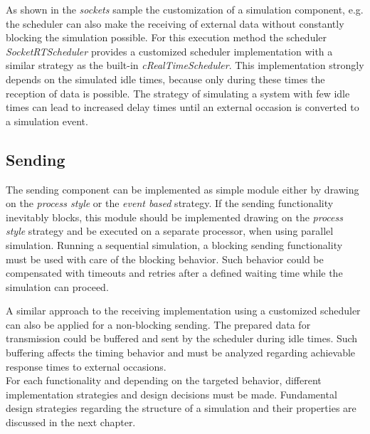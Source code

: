 As shown in the \emph{sockets} sample the customization of a simulation component, e.g. the scheduler can also make the receiving of external data without constantly blocking the simulation possible.
For this execution method the scheduler \emph{SocketRTScheduler} provides a customized scheduler implementation with a similar strategy as the built-in \emph{cRealTimeScheduler}.
This implementation strongly depends on the simulated idle times, because only during these times the reception of data is possible.
The strategy of simulating a system with few idle times can lead to increased delay times until an external occasion is converted to a simulation event.

\subsection{Sending}
\label{sec:emulation_communication_sending}
The sending component can be implemented as simple module either by drawing on the \emph{process style} or the \emph{event based} strategy.
If the sending functionality inevitably blocks, this module should be implemented drawing on the \emph{process style} strategy and be executed on a separate processor, when using parallel simulation.
Running a sequential simulation, a blocking sending functionality must be used with care of the blocking behavior.
Such behavior could be compensated with timeouts and retries after a defined waiting time while the simulation can proceed.

A similar approach to the receiving implementation using a customized scheduler can also be applied for a non-blocking sending.
The prepared data for transmission could be buffered and sent by the scheduler during idle times.
Such buffering affects the timing behavior and must be analyzed regarding achievable response times to external occasions.
\\

For each functionality and depending on the targeted behavior, different implementation strategies and design decisions must be made.
Fundamental design strategies regarding the structure of a simulation and their properties are discussed in the next chapter.